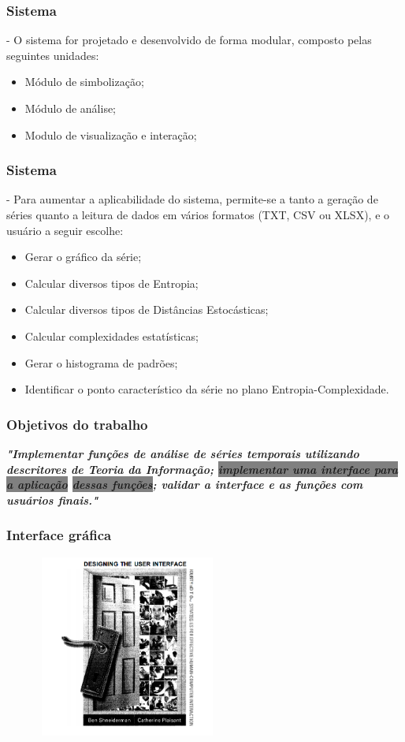 \documentclass[10pt, compress]{beamer}
\begin{document}
\begin{frame}[fragile]
\frametitle{Sistema}

- O sistema for projetado e desenvolvido de forma modular, composto pelas seguintes unidades:

\begin{itemize}
\item Módulo de simbolização;
\item Módulo de análise;
\item Modulo de visualização e interação;
\end{itemize} 

\end{frame}

\begin{frame}[fragile]
\frametitle{Sistema}

- Para aumentar a aplicabilidade do sistema, permite-se a tanto a geração de séries quanto a leitura de dados em vários formatos (TXT, CSV ou XLSX), e o usuário a seguir escolhe:

\begin{itemize}
\item Gerar o gráfico da série;
\item Calcular diversos tipos de Entropia;
\item Calcular diversos tipos de Distâncias Estocásticas;
\item Calcular complexidades estatísticas;
\item Gerar o histograma de padrões;
\item Identificar o ponto característico da série no plano Entropia-Complexidade.
\end{itemize}

\end{frame}

\begin{frame}[fragile]
\frametitle{Objetivos do trabalho}
\begin{sloppypar}
\textit{\textbf{\Large "Implementar funções de análise de séries temporais utilizando descritores de Teoria da Informação; \colorbox{gray}{implementar uma interface para a aplicação}
\colorbox{gray}{dessas funções}; validar a interface e as funções com usuários finais."}}
\end{sloppypar}
\end{frame}

\begin{frame}[fragile]
\frametitle{Interface gráfica}
\begin{figure}
  \centering
   \includegraphics[width=6cm,height=6cm]{interface.png}
\end{figure}
\end{frame}
\end{document}
